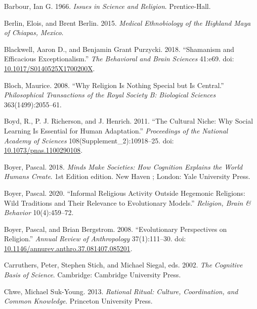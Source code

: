 \documentclass[
  11pt,
]{article}
\begin{document}
\leavevmode\hypertarget{ref-barbourIssuesScienceReligion1966}{}%
Barbour, Ian G. 1966. \emph{Issues in Science and Religion}. Prentice-Hall.

\leavevmode\hypertarget{ref-berlinMedicalEthnobiologyHighland2015}{}%
Berlin, Elois, and Brent Berlin. 2015. \emph{Medical Ethnobiology of the Highland Maya of Chiapas, Mexico}.

\leavevmode\hypertarget{ref-blackwellShamanismEfficaciousExceptionalism2018}{}%
Blackwell, Aaron D., and Benjamin Grant Purzycki. 2018. ``Shamanism and Efficacious Exceptionalism.'' \emph{The Behavioral and Brain Sciences} 41:e69. doi: \href{https://doi.org/10.1017/S0140525X1700200X}{10.1017/S0140525X1700200X}.

\leavevmode\hypertarget{ref-bloch2008religion}{}%
Bloch, Maurice. 2008. ``Why Religion Is Nothing Special but Is Central.'' \emph{Philosophical Transactions of the Royal Society B: Biological Sciences} 363(1499):2055--61.

\leavevmode\hypertarget{ref-boydCulturalNicheWhy2011}{}%
Boyd, R., P. J. Richerson, and J. Henrich. 2011. ``The Cultural Niche: Why Social Learning Is Essential for Human Adaptation.'' \emph{Proceedings of the National Academy of Sciences} 108(Supplement\_2):10918--25. doi: \href{https://doi.org/10.1073/pnas.1100290108}{10.1073/pnas.1100290108}.

\leavevmode\hypertarget{ref-boyerMindsMakeSocieties2018}{}%
Boyer, Pascal. 2018. \emph{Minds Make Societies: How Cognition Explains the World Humans Create}. 1st Edition edition. New Haven ; London: Yale University Press.

\leavevmode\hypertarget{ref-boyer2020informal}{}%
Boyer, Pascal. 2020. ``Informal Religious Activity Outside Hegemonic Religions: Wild Traditions and Their Relevance to Evolutionary Models.'' \emph{Religion, Brain \& Behavior} 10(4):459--72.

\leavevmode\hypertarget{ref-boyerEvolutionaryPerspectivesReligion2008}{}%
Boyer, Pascal, and Brian Bergstrom. 2008. ``Evolutionary Perspectives on Religion.'' \emph{Annual Review of Anthropology} 37(1):111--30. doi: \href{https://doi.org/10.1146/annurev.anthro.37.081407.085201}{10.1146/annurev.anthro.37.081407.085201}.

\leavevmode\hypertarget{ref-carruthersCognitiveBasisScience2002}{}%
Carruthers, Peter, Stephen Stich, and Michael Siegal, eds. 2002. \emph{The Cognitive Basis of Science}. Cambridge: Cambridge University Press.

\leavevmode\hypertarget{ref-chwe2013rational}{}%
Chwe, Michael Suk-Young. 2013. \emph{Rational Ritual: Culture, Coordination, and Common Knowledge}. Princeton University Press.
\end{document}
